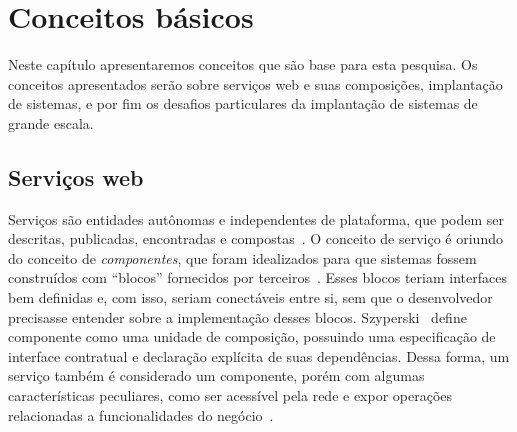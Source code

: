 \chapter{Conceitos básicos}
\label{cap:conceitos}

Neste capítulo apresentaremos conceitos que são base para esta pesquisa.
Os conceitos apresentados serão sobre serviços web e suas composições, 
implantação de sistemas, e por fim os desafios particulares da implantação
de sistemas de grande escala.


\section{Serviços web}
\label{sec:servicos}

Serviços são entidades autônomas e independentes de plataforma, que podem ser descritas, publicadas, encontradas e compostas~\cite{Papazoglou2007State}. O conceito de serviço é oriundo do conceito de \emph{componentes}, que foram idealizados para que sistemas fossem construídos com ``blocos'' fornecidos por terceiros~\cite{McIlroy1968MassProduced}. Esses blocos teriam interfaces bem definidas e, com isso, seriam conectáveis entre si, sem que o desenvolvedor precisasse entender sobre a implementação desses blocos. Szyperski~\cite{Szyperski2003Component} define componente como uma unidade de composição, possuindo uma especificação de interface contratual e declaração explícita de suas dependências. Dessa forma, um serviço também é considerado um componente, porém com algumas características peculiares, como ser acessível pela rede e expor operações relacionadas a funcionalidades do negócio~\cite{Hewitt2009JavaSOA}. 


